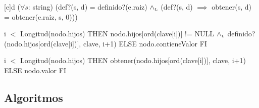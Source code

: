 \Abs[estr]{\dicString}[e]{d}
{($\forall s$: string)
(def?(s, d) = definido?(e.raiz) $\land_{\mathrm{\scriptscriptstyle{L}}}$
(def?(s, d) $\implies$ obtener(s, d) = obtener(e.raiz, s, 0)))
}



{\IF i $<$ Longitud(nodo.hijos) THEN
	nodo.hijos[ord(clave[i])] != NULL $\land_{\mathrm{\scriptscriptstyle{L}}}$ definido?(nodo.hijos[ord(clave[i])], clave, i+1)
ELSE
	nodo.contieneValor
FI}

{\IF i $<$ Longitud(nodo.hijos) THEN
	obtener(nodo.hijos[ord(clave[i])], clave, i+1)
ELSE
	nodo.valor
FI}

\subsection{Algoritmos}

\begin{algorithm}[H]
	\SetAlgoLined
	\NoCaptionOfAlgo
	\caption{}
\end{algorithm}




